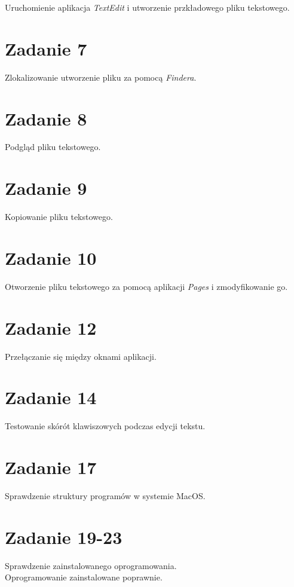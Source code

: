 \documentclass[fleqn,onecolumn,a4paper,12pt,titlepage]{article}
\begin{document}
Uruchomienie aplikacja \textit{TextEdit} i utworzenie przkładowego pliku tekstowego.

\section*{Zadanie 7}

Zlokalizowanie utworzenie pliku za pomocą \textit{Findera}.

\section*{Zadanie 8}

Podgląd pliku tekstowego.

\section*{Zadanie 9}

Kopiowanie pliku tekstowego.

\section*{Zadanie 10}

Otworzenie pliku tekstowego za pomocą aplikacji \textit{Pages} i zmodyfikowanie go.

\section*{Zadanie 12}

Przełączanie się między oknami aplikacji.

\section*{Zadanie 14}

Testowanie skórót klawiszowych podczas edycji tekstu.

\section*{Zadanie 17}

Sprawdzenie struktury programów w systemie MacOS.

\section*{Zadanie 19-23}

Sprawdzenie zainstalowanego oprogramowania.\\
Oprogramowanie zainstalowane poprawnie.
\end{document}
